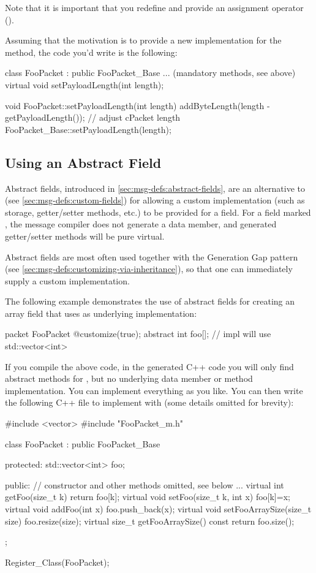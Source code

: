 Note that it is important that you redefine  and
provide an assignment operator ().

Assuming that the motivation is to provide a new implementation for the
 method, the code you'd write is the following:

\begin{cpp}
class FooPacket : public FooPacket_Base
{
    ... (mandatory methods, see above)
    virtual void setPayloadLength(int length);
}

void FooPacket::setPayloadLength(int length)
{
    addByteLength(length - getPayloadLength()); // adjust cPacket length
    FooPacket_Base::setPayloadLength(length);
}
\end{cpp}


\subsection{Using an Abstract Field}
\label{sec:msg-defs:customizing-via-abstact-field}

Abstract fields, introduced in \ref{sec:msg-defs:abstract-fields}, are an
alternative to  (see \ref{sec:msg-defs:custom-fields}) for
allowing a custom implementation (such as storage, getter/setter methods, etc.)
to be provided for a field. For a field marked , the message compiler does
not generate a data member, and generated getter/setter methods will be pure
virtual.

Abstract fields are most often used together with the Generation Gap pattern
(see \ref{sec:msg-defs:customizing-via-inheritance}), so that one can
immediately supply a custom implementation.

The following example demonstrates the use of abstract fields for creating
an array field that uses  as underlying implementation:

\begin{msg}
packet FooPacket
{
    @customize(true);
    abstract int foo[]; // impl will use std::vector<int>
}
\end{msg}

If you compile the above code, in the generated C++ code you will only find
abstract methods for , but no underlying data member or method
implementation. You can implement everything as you like. You can then write the
following C++ file to implement  with  (some
details omitted for brevity):

\begin{cpp}
#include <vector>
#include "FooPacket_m.h"

class FooPacket : public FooPacket_Base
{
  protected:
    std::vector<int> foo;

  public:
    // constructor and other methods omitted, see below
    ...
    virtual int getFoo(size_t k) {return foo[k];}
    virtual void setFoo(size_t k, int x) {foo[k]=x;}
    virtual void addFoo(int x) {foo.push_back(x);}
    virtual void setFooArraySize(size_t size) {foo.resize(size);}
    virtual size_t getFooArraySize() const {return foo.size();}
};

Register_Class(FooPacket);
\end{cpp}

